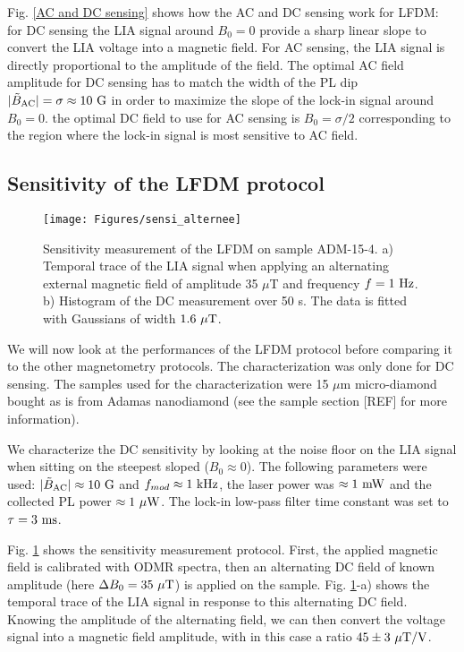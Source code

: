 \documentclass[a4paper,11pt]{report}
\begin{document}
Fig. \ref{AC and DC sensing} shows how the AC and DC sensing work for LFDM: for DC sensing the LIA signal around $B_0=0$ provide a sharp linear slope to convert the LIA voltage into a magnetic field. For AC sensing, the LIA signal is directly proportional to the amplitude of the field. The optimal AC field amplitude for DC sensing has to match the width of the PL dip $|\tilde{B}_{\rm AC}| = \sigma \approx 10\ \rm G$ in order to maximize the slope of the lock-in signal around $B_0=0$. the optimal DC field to use for AC sensing is $B_0= \sigma/2$ corresponding to the region where the lock-in signal is most sensitive to AC field. 

\subsection{Sensitivity of the LFDM protocol}
\begin{figure}[h!]
\centering
\texttt{[image: Figures/sensi\_alternee]}
\caption{Sensitivity measurement of the LFDM on sample ADM-15-4. a) Temporal trace of the LIA signal when applying an alternating external magnetic field of amplitude 35 $\mu$T and frequency $f=1\ \rm Hz$. b) Histogram of the DC measurement over 50 s. The data is fitted with Gaussians of width $1.6\ \rm{\mu T}$.}
\label{sensei alternee}
\end{figure}

We will now look at the performances of the LFDM protocol before comparing it to the other magnetometry protocols. The characterization was only done for DC sensing. The samples used for the characterization were 15 $\mu$m micro-diamond bought as is from Adamas nanodiamond (see the sample section [REF] for more information).

We characterize the DC sensitivity by looking at the noise floor on the LIA signal when sitting on the steepest sloped ($B_0\approx 0$). The following parameters were used: $|\tilde{B}_{\rm AC}|\approx 10\ \rm G$ and $f_{mod} \approx 1\ \rm kHz$, the laser power was $\approx 1\ \rm mW$ and the collected PL power $\approx 1\ \rm{\mu W}$. The lock-in low-pass filter time constant was set to $\tau=3\ \rm ms$.

Fig. \ref{sensei alternee} shows the sensitivity measurement protocol. First, the applied magnetic field is calibrated with ODMR spectra, then an alternating DC field of known amplitude (here $\Delta B_0=35\ \rm{\mu T}$) is applied on the sample. Fig. \ref{sensei alternee}-a) shows the temporal trace of the LIA signal in response to this alternating DC field. Knowing the amplitude of the alternating field, we can then convert the voltage signal into a magnetic field amplitude, with in this case a ratio $45 \pm 3\ \rm{\mu T /V}$.
\end{document}
